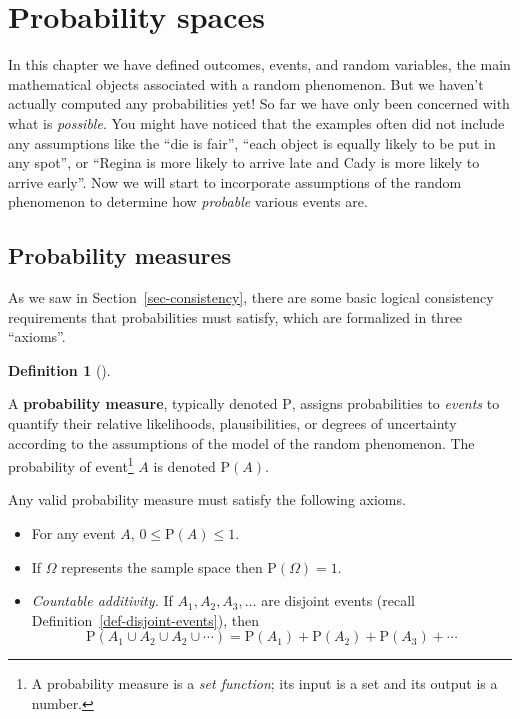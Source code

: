 \documentclass[
  letterpaper,
  DIV=11,
  numbers=noendperiod]{scrreprt}
\providecommand{\tightlist}{%
  \setlength{\itemsep}{0pt}\setlength{\parskip}{0pt}}
\theoremstyle{plain}
\theoremstyle{definition}
\theoremstyle{definition}
\theoremstyle{definition}
\newtheorem{definition}{Definition}[chapter]
\theoremstyle{remark}
\begin{document}
\section{Probability spaces}\label{sec-probspace}

In this chapter we have defined outcomes, events, and random variables,
the main mathematical objects associated with a random phenomenon. But
we haven't actually computed any probabilities yet! So far we have only
been concerned with what is \emph{possible}. You might have noticed that
the examples often did not include any assumptions like the ``die is
fair'', ``each object is equally likely to be put in any spot'', or
``Regina is more likely to arrive late and Cady is more likely to arrive
early''. Now we will start to incorporate assumptions of the random
phenomenon to determine how \emph{probable} various events are.

\subsection{Probability measures}\label{probability-measures}

As we saw in Section~\ref{sec-consistency}, there are some basic logical
consistency requirements that probabilities must satisfy, which are
formalized in three ``axioms''.

\begin{definition}[]\protect\hypertarget{def-probability-measure}{}\label{def-probability-measure}

A \textbf{probability measure}, typically
denoted \(\textrm{P}\), assigns probabilities to \emph{events} to
quantify their relative likelihoods, plausibilities, or degrees of
uncertainty according to the assumptions of the model of the random
phenomenon. The probability of event\footnote{A probability measure is a
  \emph{set function}; its input is a set and its output is a number.}
\(A\) is denoted \(\textrm{P}(A)\).

Any valid probability measure must satisfy the following axioms.

\end{definition}

\begin{itemize}
\tightlist
\item
  For any event \(A\), \(0 \le \textrm{P}(A) \le 1\).
\item
  If \(\Omega\) represents the sample space then
  \(\textrm{P}(\Omega) = 1\).
\item
  \emph{Countable additivity.} If
  \(A_1, A_2, A_3, \ldots\) are disjoint events (recall
  Definition~\ref{def-disjoint-events}), then \[
  \textrm{P}(A_1 \cup A_2 \cup A_2 \cup \cdots) = \textrm{P}(A_1) + \textrm{P}(A_2) +\textrm{P}(A_3) + \cdots
  \]
\end{itemize}
\end{document}
